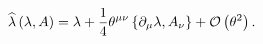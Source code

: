 \begin{equation}
\widehat{\lambda }\left( \lambda ,A\right) =\lambda +\frac{1}{4}\theta ^{\mu\nu}\left\{ \partial
_{\mu}\lambda ,A_{\nu}\right\} +{\cal O}\left( \theta ^{2}\right). \label{difeq}
\end{equation}

